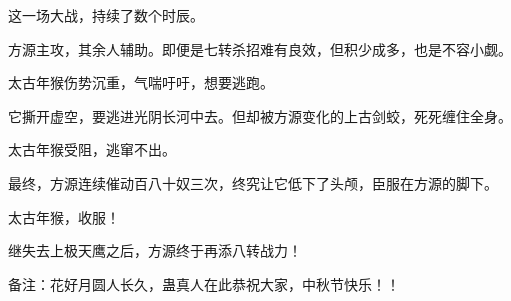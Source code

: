 \begin{this_body}
这一场大战，持续了数个时辰。

方源主攻，其余人辅助。即便是七转杀招难有良效，但积少成多，也是不容小觑。

太古年猴伤势沉重，气喘吁吁，想要逃跑。

它撕开虚空，要逃进光阴长河中去。但却被方源变化的上古剑蛟，死死缠住全身。

太古年猴受阻，逃窜不出。

最终，方源连续催动百八十奴三次，终究让它低下了头颅，臣服在方源的脚下。

太古年猴，收服！

继失去上极天鹰之后，方源终于再添八转战力！

备注：花好月圆人长久，蛊真人在此恭祝大家，中秋节快乐！！

\end{this_body}

